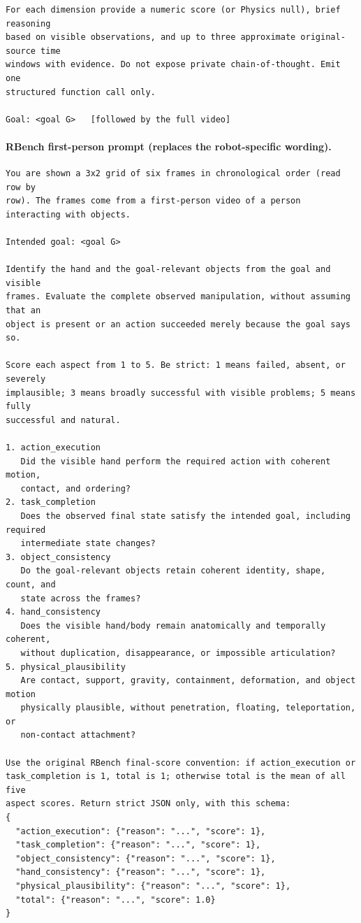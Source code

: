 \begin{lstlisting}[style=promptstyle]
For each dimension provide a numeric score (or Physics null), brief reasoning
based on visible observations, and up to three approximate original-source time
windows with evidence. Do not expose private chain-of-thought. Emit one
structured function call only.

Goal: <goal G>   [followed by the full video]
\end{lstlisting}
\paragraph{RBench first-person prompt (replaces the robot-specific wording).}
\begin{lstlisting}[style=promptstyle]
You are shown a 3x2 grid of six frames in chronological order (read row by
row). The frames come from a first-person video of a person interacting with objects.

Intended goal: <goal G>

Identify the hand and the goal-relevant objects from the goal and visible
frames. Evaluate the complete observed manipulation, without assuming that an
object is present or an action succeeded merely because the goal says so.

Score each aspect from 1 to 5. Be strict: 1 means failed, absent, or severely
implausible; 3 means broadly successful with visible problems; 5 means fully
successful and natural.

1. action_execution
   Did the visible hand perform the required action with coherent motion,
   contact, and ordering?
2. task_completion
   Does the observed final state satisfy the intended goal, including required
   intermediate state changes?
3. object_consistency
   Do the goal-relevant objects retain coherent identity, shape, count, and
   state across the frames?
4. hand_consistency
   Does the visible hand/body remain anatomically and temporally coherent,
   without duplication, disappearance, or impossible articulation?
5. physical_plausibility
   Are contact, support, gravity, containment, deformation, and object motion
   physically plausible, without penetration, floating, teleportation, or
   non-contact attachment?

Use the original RBench final-score convention: if action_execution or
task_completion is 1, total is 1; otherwise total is the mean of all five
aspect scores. Return strict JSON only, with this schema:
{
  "action_execution": {"reason": "...", "score": 1},
  "task_completion": {"reason": "...", "score": 1},
  "object_consistency": {"reason": "...", "score": 1},
  "hand_consistency": {"reason": "...", "score": 1},
  "physical_plausibility": {"reason": "...", "score": 1},
  "total": {"reason": "...", "score": 1.0}
}
\end{lstlisting}
